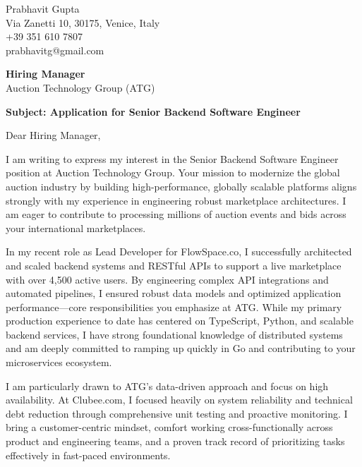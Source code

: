 \documentclass[11pt,a4paper]{article}
\begin{document}
\begin{flushright}
Prabhavit Gupta \\
Via Zanetti 10, 30175, Venice, Italy \\
+39 351 610 7807 \\
prabhavitg@gmail.com \\
\end{flushright}

\vspace{2em}

\noindent
\textbf{Hiring Manager} \\
Auction Technology Group (ATG) \\

\vspace{1em}

\noindent
\textbf{Subject: Application for Senior Backend Software Engineer}

\vspace{1em}

\noindent
Dear Hiring Manager,

\vspace{1em}
\noindent
I am writing to express my interest in the Senior Backend Software Engineer position at Auction Technology Group. Your mission to modernize the global auction industry by building high-performance, globally scalable platforms aligns strongly with my experience in engineering robust marketplace architectures. I am eager to contribute to processing millions of auction events and bids across your international marketplaces.

\vspace{1em}
\noindent
In my recent role as Lead Developer for FlowSpace.co, I successfully architected and scaled backend systems and RESTful APIs to support a live marketplace with over 4,500 active users. By engineering complex API integrations and automated pipelines, I ensured robust data models and optimized application performance—core responsibilities you emphasize at ATG. While my primary production experience to date has centered on TypeScript, Python, and scalable backend services, I have strong foundational knowledge of distributed systems and am deeply committed to ramping up quickly in Go and contributing to your microservices ecosystem. 

\vspace{1em}
\noindent
I am particularly drawn to ATG's data-driven approach and focus on high availability. At Clubee.com, I focused heavily on system reliability and technical debt reduction through comprehensive unit testing and proactive monitoring. I bring a customer-centric mindset, comfort working cross-functionally across product and engineering teams, and a proven track record of prioritizing tasks effectively in fast-paced environments.
\end{document}
